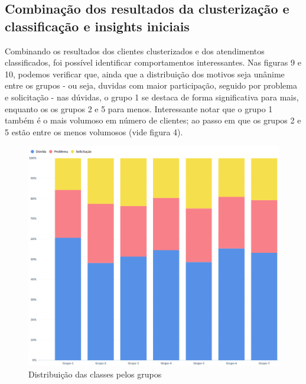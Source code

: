 \documentclass[twocolumn]{rbef}
\newcommand{\1}{\mathbbm{1}}
\begin{document}
\subsection{Combinação dos resultados da clusterização e classificação e insights iniciais} \label{Sessao4.4}
Combinando os resultados dos clientes clusterizados e dos atendimentos classificados, foi possível identificar comportamentos interessantes. Nas figuras 9 e 10, podemos verificar que, ainda que a distribuição dos motivos seja unânime entre os grupos - ou seja, duvidas com maior participação, seguido por problema e solicitação - nas dúvidas, o grupo 1 se destaca de forma significativa para mais, enquanto os os grupos 2 e 5 para menos. Interessante notar que o grupo 1 também é o mais volumoso em número de clientes; ao passo em que os grupos 2 e 5 estão entre os menos volumosos (vide figura 4).
\begin{figure}[!htb]
  \centering \includegraphics[scale=0.35]{9. Classificação atendimentos (7 clusters) - chart.png}
  \caption{Distribuição das classes pelos grupos}
  \label{fig9}
\end{figure}
\end{document}
